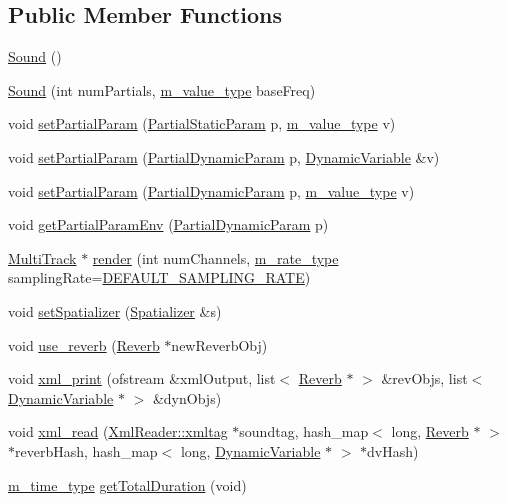 \subsection*{Public Member Functions}
\begin{CompactItemize}
\item 
\hyperlink{classSound_a0}{Sound} ()
\item 
\hyperlink{classSound_a1}{Sound} (int num\-Partials, \hyperlink{Types_8h_a3}{m\_\-value\_\-type} base\-Freq)
\item 
void \hyperlink{classSound_a2}{set\-Partial\-Param} (\hyperlink{Partial_8h_a19}{Partial\-Static\-Param} p, \hyperlink{Types_8h_a3}{m\_\-value\_\-type} v)
\item 
void \hyperlink{classSound_a3}{set\-Partial\-Param} (\hyperlink{Partial_8h_a20}{Partial\-Dynamic\-Param} p, \hyperlink{classDynamicVariable}{Dynamic\-Variable} \&v)
\item 
void \hyperlink{classSound_a4}{set\-Partial\-Param} (\hyperlink{Partial_8h_a20}{Partial\-Dynamic\-Param} p, \hyperlink{Types_8h_a3}{m\_\-value\_\-type} v)
\item 
void \hyperlink{classSound_a5}{get\-Partial\-Param\-Env} (\hyperlink{Partial_8h_a20}{Partial\-Dynamic\-Param} p)
\item 
\hyperlink{classMultiTrack}{Multi\-Track} $\ast$ \hyperlink{classSound_a6}{render} (int num\-Channels, \hyperlink{Types_8h_a4}{m\_\-rate\_\-type} sampling\-Rate=\hyperlink{Types_8h_a5}{DEFAULT\_\-SAMPLING\_\-RATE})
\item 
void \hyperlink{classSound_a7}{set\-Spatializer} (\hyperlink{classSpatializer}{Spatializer} \&s)
\item 
void \hyperlink{classSound_a8}{use\_\-reverb} (\hyperlink{classReverb}{Reverb} $\ast$new\-Reverb\-Obj)
\item 
void \hyperlink{classSound_a9}{xml\_\-print} (ofstream \&xml\-Output, list$<$ \hyperlink{classReverb}{Reverb} $\ast$ $>$ \&rev\-Objs, list$<$ \hyperlink{classDynamicVariable}{Dynamic\-Variable} $\ast$ $>$ \&dyn\-Objs)
\item 
void \hyperlink{classSound_a10}{xml\_\-read} (\hyperlink{classXmlReader_1_1xmltag}{Xml\-Reader::xmltag} $\ast$soundtag, hash\_\-map$<$ long, \hyperlink{classReverb}{Reverb} $\ast$ $>$ $\ast$reverb\-Hash, hash\_\-map$<$ long, \hyperlink{classDynamicVariable}{Dynamic\-Variable} $\ast$ $>$ $\ast$dv\-Hash)
\item 
\hyperlink{Types_8h_a2}{m\_\-time\_\-type} \hyperlink{classSound_a11}{get\-Total\-Duration} (void)
\end{CompactItemize}
